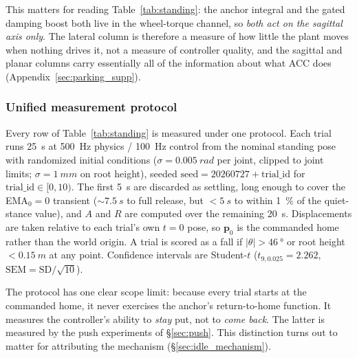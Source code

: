 \documentclass[conference]{IEEEtran}
\begin{document}
This matters for reading Table~\ref{tab:standing}: the anchor integral and the
gated damping boost both live in the wheel-torque channel, so \emph{both act on
the sagittal axis only}. The lateral column is therefore a measure of how little
the plant moves when nothing drives it, not a measure of controller quality, and
the sagittal and planar columns carry essentially all of the information about
what ACC does (Appendix~\ref{sec:parking_supp}).

\subsubsection{Unified measurement protocol}

Every row of Table~\ref{tab:standing} is measured under one protocol.
Each trial runs \SI{25}{s} at \SI{500}{Hz} physics / \SI{100}{Hz} control from the
nominal standing pose with randomized initial conditions
($\sigma{=}\SI{0.005}{rad}$ per joint, clipped to joint limits;
$\sigma{=}\SI{1}{mm}$ on root height), seeded
$\text{seed}{=}20260727{+}\text{trial\_id}$ for $\text{trial\_id}\in[0,10)$.
The first \SI{5}{s} are discarded as settling, long enough to cover the
EMA$_0{=}0$ transient (${\sim}\SI{7.5}{s}$ to full release, but ${<}\SI{5}{s}$ to
within \SI{1}{\percent} of the quiet-stance value), and $A$ and $R$ are computed
over the remaining \SI{20}{s}. Displacements are taken relative to each trial's own
$t{=}0$ pose, so $\mathbf{p}_0$ is the commanded home rather than the world origin.
A trial is scored as a fall if $|\theta|{>}\SI{46}{\degree}$ or root height
${<}\SI{0.15}{m}$ at any point. Confidence intervals are Student-$t$
($t_{9,0.025}{=}2.262$, $\text{SEM}{=}\text{SD}/\sqrt{10}$).

The protocol has one clear scope limit: because every trial starts at the
commanded home, it never exercises the anchor's return-to-home function. It
measures the controller's ability to \emph{stay} put, not to \emph{come back}. The
latter is measured by the push experiments of \S\ref{sec:push}. This distinction
turns out to matter for attributing the mechanism (\S\ref{sec:idle_mechanism}).
\end{document}
